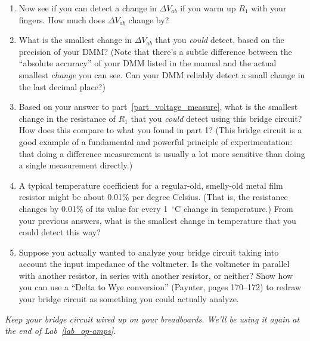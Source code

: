 \begin{enumerate}[wide]
\item Now see if you can detect a change in $\Delta V_{ab}$ if you warm up $R_1$ with your fingers.  How much does $\Delta V_{ab}$ change by?

\item What is the smallest change in $\Delta V_{ab}$ that you \textit{could} detect, based on the precision of your DMM?  (Note that there's a subtle difference between the ``absolute accuracy'' of your DMM listed in the manual and the actual smallest \textit{change} you can see.  Can your DMM reliably detect a small change in the last decimal place?) \label{part_voltage_measure}

\item Based on your answer to part~\ref{part_voltage_measure}, what is the smallest change in the resistance of $R_1$ that you \textit{could} detect using this bridge circuit?  How does this compare to what you found in part 1?  (This bridge circuit is a good example of a fundamental and powerful principle of experimentation: that doing a difference measurement is usually a lot more sensitive than doing a single measurement directly.)

\item A typical temperature coefficient for a regular-old, smelly-old metal film resistor might be about 0.01\% per degree Celsius.  (That is, the resistance changes by 0.01\% of its value for every 1~$^\circ$C change in temperature.)  From your previous answers, what is the smallest change in temperature that you could detect this way?

\item Suppose you actually wanted to analyze your bridge circuit taking into account the input impedance of the voltmeter.  Is the voltmeter in parallel with another resistor, in series with another resistor, or neither?  Show how you can use a ``Delta to Wye conversion'' (Paynter, pages 170--172) to redraw your bridge circuit as something you could actually analyze.

\end{enumerate}

\textit{Keep your bridge circuit wired up on your breadboards.  We'll be using it again at the end of Lab~\ref{lab_op-amps}.}






